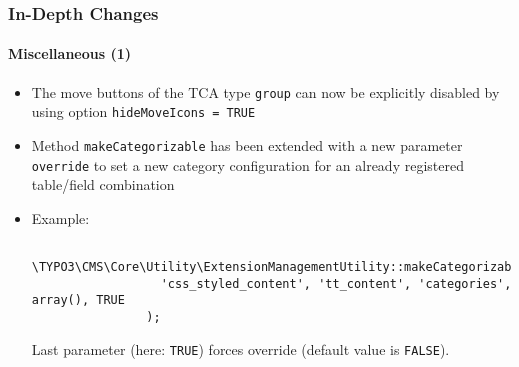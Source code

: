 \begin{frame}[fragile]
	\frametitle{In-Depth Changes}
	\framesubtitle{Miscellaneous (1)}

	\begin{itemize}

		\item The move buttons of the TCA type \texttt{group} can now be explicitly
			disabled by using option \texttt{hideMoveIcons = TRUE}

		\item Method \texttt{makeCategorizable} has been extended with a new parameter
			\texttt{override} to set a new category configuration for an already registered
			table/field combination

		\item Example:

			\begin{lstlisting}
				\TYPO3\CMS\Core\Utility\ExtensionManagementUtility::makeCategorizable(
				  'css_styled_content', 'tt_content', 'categories', array(), TRUE
				);
			\end{lstlisting}

			\small
				Last parameter (here: \texttt{TRUE}) forces override (default value is \texttt{FALSE}).
			\normalsize

	\end{itemize}

\end{frame}


